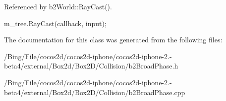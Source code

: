 Referenced by b2\-World\-::\-Ray\-Cast().


\begin{DoxyCode}
{
        m_tree.RayCast(callback, input);
}
\end{DoxyCode}


The documentation for this class was generated from the following files\-:\begin{DoxyCompactItemize}
\item 
/\-Bing/\-File/cocos2d/cocos2d-\/iphone/cocos2d-\/iphone-\/2.-\/beta4/external/\-Box2d/\-Box2\-D/\-Collision/b2\-Broad\-Phase.\-h\item 
/\-Bing/\-File/cocos2d/cocos2d-\/iphone/cocos2d-\/iphone-\/2.-\/beta4/external/\-Box2d/\-Box2\-D/\-Collision/b2\-Broad\-Phase.\-cpp\end{DoxyCompactItemize}
